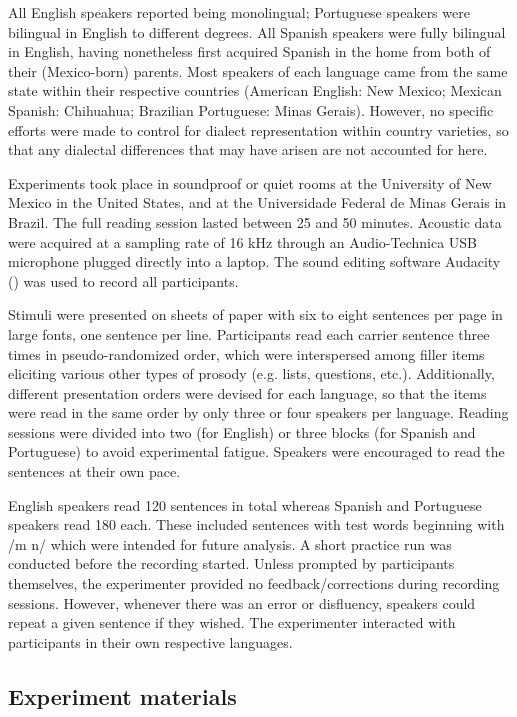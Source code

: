 \documentclass[output=paper]{langscibook}
\begin{document}
All English speakers reported being monolingual; Portuguese speakers were bilingual in English to different degrees. All Spanish speakers were fully bilingual in English, having nonetheless first acquired Spanish in the home from both of their (Mexico-born) parents. Most speakers of each language came from the same state within their respective countries (American English: New Mexico; Mexican Spanish: Chihuahua; Brazilian Portuguese: Minas Gerais). However, no specific efforts were made to control for dialect representation within country varieties, so that any dialectal differences that may have arisen are not accounted for here. 

Experiments took place in soundproof or quiet rooms at the University of New Mexico in the United States, and at the Universidade Federal de Minas Gerais in Brazil. The full reading session lasted between 25 and 50 minutes. Acoustic data were acquired at a sampling rate of 16 kHz through an Audio-Technica USB microphone plugged directly into a laptop. The sound editing software Audacity (\citealt{audacity2014audacity}) was used to record all participants. 

Stimuli were presented on sheets of paper with six to eight sentences per page in large fonts, one sentence per line. Participants read each carrier sentence three times in pseudo-randomized order, which were interspersed among filler items eliciting various other types of prosody (e.g. lists, questions, etc.). Additionally, different presentation orders were devised for each language, so that the items were read in the same order by only three or four speakers per language. Reading sessions were divided into two (for English) or three blocks (for Spanish and Portuguese) to avoid experimental fatigue. Speakers were encouraged to read the sentences at their own pace. 

English speakers read 120 sentences in total whereas Spanish and Portuguese speakers read 180 each. These included sentences with test words beginning with /m n/ which were intended for future analysis. A short practice run was conducted before the recording started. Unless prompted by participants themselves, the experimenter provided no feedback/corrections during recording sessions. However, whenever there was an error or disfluency, speakers could repeat a given sentence if they wished. The experimenter interacted with participants in their own respective languages.

\subsection{Experiment materials}\label{2.2}
\end{document}
